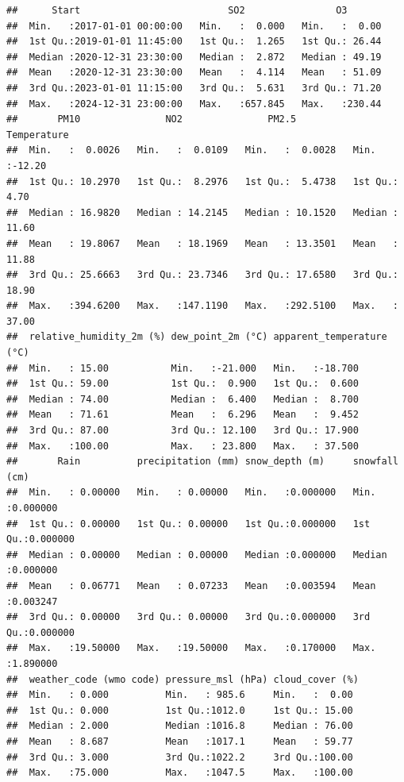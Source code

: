 \documentclass[
]{article}
\begin{document}
\begin{verbatim}
##      Start                          SO2                O3        
##  Min.   :2017-01-01 00:00:00   Min.   :  0.000   Min.   :  0.00  
##  1st Qu.:2019-01-01 11:45:00   1st Qu.:  1.265   1st Qu.: 26.44  
##  Median :2020-12-31 23:30:00   Median :  2.872   Median : 49.19  
##  Mean   :2020-12-31 23:30:00   Mean   :  4.114   Mean   : 51.09  
##  3rd Qu.:2023-01-01 11:15:00   3rd Qu.:  5.631   3rd Qu.: 71.20  
##  Max.   :2024-12-31 23:00:00   Max.   :657.845   Max.   :230.44  
##       PM10               NO2               PM2.5           Temperature    
##  Min.   :  0.0026   Min.   :  0.0109   Min.   :  0.0028   Min.   :-12.20  
##  1st Qu.: 10.2970   1st Qu.:  8.2976   1st Qu.:  5.4738   1st Qu.:  4.70  
##  Median : 16.9820   Median : 14.2145   Median : 10.1520   Median : 11.60  
##  Mean   : 19.8067   Mean   : 18.1969   Mean   : 13.3501   Mean   : 11.88  
##  3rd Qu.: 25.6663   3rd Qu.: 23.7346   3rd Qu.: 17.6580   3rd Qu.: 18.90  
##  Max.   :394.6200   Max.   :147.1190   Max.   :292.5100   Max.   : 37.00  
##  relative_humidity_2m (%) dew_point_2m (°C) apparent_temperature (°C)
##  Min.   : 15.00           Min.   :-21.000   Min.   :-18.700          
##  1st Qu.: 59.00           1st Qu.:  0.900   1st Qu.:  0.600          
##  Median : 74.00           Median :  6.400   Median :  8.700          
##  Mean   : 71.61           Mean   :  6.296   Mean   :  9.452          
##  3rd Qu.: 87.00           3rd Qu.: 12.100   3rd Qu.: 17.900          
##  Max.   :100.00           Max.   : 23.800   Max.   : 37.500          
##       Rain          precipitation (mm) snow_depth (m)     snowfall (cm)     
##  Min.   : 0.00000   Min.   : 0.00000   Min.   :0.000000   Min.   :0.000000  
##  1st Qu.: 0.00000   1st Qu.: 0.00000   1st Qu.:0.000000   1st Qu.:0.000000  
##  Median : 0.00000   Median : 0.00000   Median :0.000000   Median :0.000000  
##  Mean   : 0.06771   Mean   : 0.07233   Mean   :0.003594   Mean   :0.003247  
##  3rd Qu.: 0.00000   3rd Qu.: 0.00000   3rd Qu.:0.000000   3rd Qu.:0.000000  
##  Max.   :19.50000   Max.   :19.50000   Max.   :0.170000   Max.   :1.890000  
##  weather_code (wmo code) pressure_msl (hPa) cloud_cover (%) 
##  Min.   : 0.000          Min.   : 985.6     Min.   :  0.00  
##  1st Qu.: 0.000          1st Qu.:1012.0     1st Qu.: 15.00  
##  Median : 2.000          Median :1016.8     Median : 76.00  
##  Mean   : 8.687          Mean   :1017.1     Mean   : 59.77  
##  3rd Qu.: 3.000          3rd Qu.:1022.2     3rd Qu.:100.00  
##  Max.   :75.000          Max.   :1047.5     Max.   :100.00  

\end{verbatim}
\end{document}
